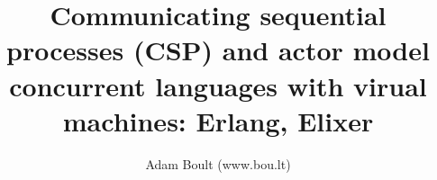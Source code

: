 \documentclass[oneside]{book}
\begin{document}
\author{Adam Boult (www.bou.lt)}
\title{Communicating sequential processes (CSP) and actor model concurrent languages with virual machines: Erlang, Elixer}
\maketitle

\setcounter{tocdepth}{0}
\tableofcontents


\end{document}
